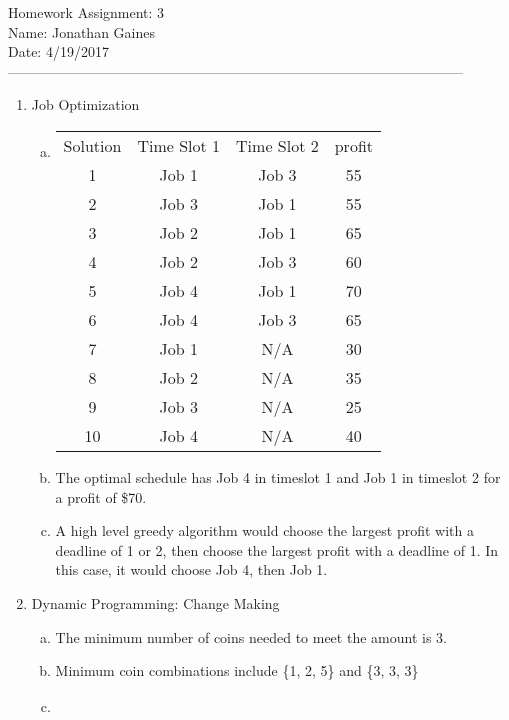 \documentclass[12pt]{article}
\begin{document}
Homework Assignment: 3\\ 
Name: Jonathan Gaines\\ 
Date: 4/19/2017\\ --------------------------------------------------------------------------------------------------
\begin {enumerate}
\item Job Optimization
	\begin {enumerate}[(a)]
		\item
			\begin{tabular}{ c | c | c | c }
					 Solution & Time Slot 1 & Time Slot 2 & profit \\
									1 & Job 1 			& Job 3				& 55 \\
									2 & Job 3				& Job 1				& 55 \\
									3 & Job 2 			& Job 1				& 65 \\
									4 & Job 2 			& Job 3				& 60 \\
									5 & Job 4				& Job 1				& 70 \\
									6 & Job 4				& Job 3				& 65 \\ 
									7 & Job 1				& N/A					& 30 \\
									8 & Job 2				& N/A					& 35 \\
									9 & Job 3 			& N/A					& 25 \\
									10& Job 4				& N/A					& 40
			\end{tabular}
		\item
			The optimal schedule has Job 4 in timeslot 1 and Job 1 in timeslot 2 for a profit of \$70. \par
		\item
			A high level greedy algorithm would choose the largest profit with a deadline of 1 or 2, then choose the largest profit with a deadline of 1. In this case, it would choose Job 4, then Job 1. \par
	\end {enumerate}
\item Dynamic Programming: Change Making
	\begin {enumerate}[(a)]
		\item
			The minimum number of coins needed to meet the amount is 3. \par
		\item
			Minimum coin combinations include \{1, 2, 5\} and \{3, 3, 3\}
		\item
			\begin{tabular}{c | c | c | c | c | c | c | c | c | c | c}

\end{tabular}
\end{enumerate}
\end{enumerate}
\end{document}
